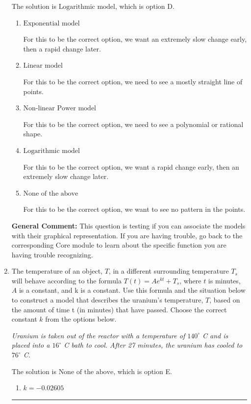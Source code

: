 \documentclass{extbook}[14pt]
\newcommand{\litem}[1]{\item #1

\rule{\textwidth}{0.4pt}}
\begin{document}
\begin{enumerate}
{The solution is \( \text{Logarithmic model} \), which is option D.\begin{enumerate}[label=\Alph*.]
\item \( \text{Exponential model} \)

For this to be the correct option, we want an extremely slow change early, then a rapid change later.
\item \( \text{Linear model} \)

For this to be the correct option, we need to see a mostly straight line of points.
\item \( \text{Non-linear Power model} \)

For this to be the correct option, we need to see a polynomial or rational shape.
\item \( \text{Logarithmic model} \)

For this to be the correct option, we want a rapid change early, then an extremely slow change later.
\item \( \text{None of the above} \)

For this to be the correct option, we want to see no pattern in the points.
\end{enumerate}

\textbf{General Comment:} This question is testing if you can associate the models with their graphical representation. If you are having trouble, go back to the corresponding Core module to learn about the specific function you are having trouble recognizing.
}
\litem{
The temperature of an object, $T$, in a different surrounding temperature $T_s$ will behave according to the formula $T(t) = Ae^{kt} + T_s$, where $t$ is minutes, $A$ is a constant, and k is a constant. Use this formula and the situation below to construct a model that describes the uranium's temperature, $T$, based on the amount of time t (in minutes) that have passed. Choose the correct constant $k$ from the options below.

\begin{center}
    \textit{ Uranium is taken out of the reactor with a temperature of $140^{\circ}$ C and is placed into a $16^{\circ}$ C bath to cool. After 27 minutes, the uranium has cooled to $76^{\circ}$ C. }
\end{center}


The solution is \( \text{None of the above} \), which is option E.\begin{enumerate}[label=\Alph*.]
\item \( k = -0.02605 \)


\end{enumerate}}
\end{enumerate}
\end{document}
